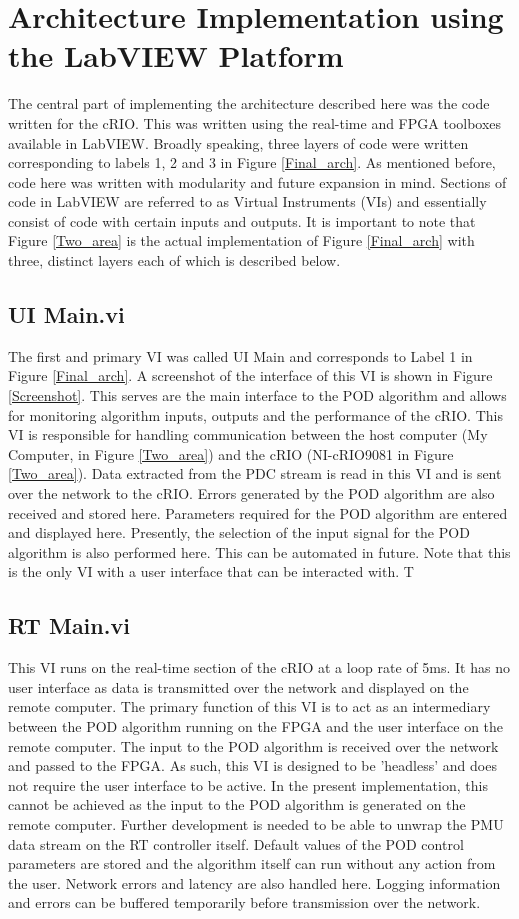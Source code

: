 \documentclass[conference]{IEEEtran}
\begin{document}
\section{Architecture Implementation using the LabVIEW Platform} \label{HILtest}
The central part of implementing the architecture described here was the code written for the cRIO. This was written using the real-time and FPGA toolboxes available in LabVIEW\cite{cRIO9081}. Broadly speaking, three layers of code were written corresponding to labels 1, 2 and 3 in Figure \ref{Final_arch}. As mentioned before, code here was written with modularity and future expansion in mind. Sections of code in LabVIEW are referred to as Virtual Instruments (VIs) and essentially consist of code with certain inputs and outputs\cite{cRIO9081}. It is important to note that Figure \ref{Two_area} is the actual implementation of Figure \ref{Final_arch} with three, distinct layers each of which is described below.
\subsection{UI Main.vi} The first and primary VI was called UI Main and corresponds to Label 1 in Figure \ref{Final_arch}. A screenshot of the interface of this VI is shown in Figure \ref{Screenshot}. This serves are the main interface to the POD algorithm and allows for monitoring algorithm inputs, outputs and the performance of the cRIO. This VI is responsible for handling communication between the host computer (My Computer, in Figure \ref{Two_area}) and the cRIO (NI-cRIO9081 in Figure \ref{Two_area}). Data extracted from the PDC stream is read in this VI and is sent over the network to the cRIO. Errors generated by the POD algorithm are also received and stored here. Parameters required for the POD algorithm are entered and displayed here. Presently, the selection of the input signal for the POD algorithm is also performed here. This can be automated in future. Note that this is the only VI with a user interface that can be interacted with. T
\subsection{RT Main.vi}
This VI runs on the real-time section of the cRIO at a loop rate of 5ms. It has no user interface as data is transmitted over the network and displayed on the remote computer. The primary function of this VI is to act as an intermediary between the POD algorithm running on the FPGA and the user interface on the remote computer. The input to the POD algorithm is received over the network and passed to the FPGA. As such, this VI is designed to be 'headless' and does not require the user interface to be active. In the present implementation, this cannot be achieved as the input to the POD algorithm is generated on the remote computer. Further development is needed to be able to unwrap the PMU data stream on the RT controller itself. Default values of the POD control parameters are stored and the algorithm itself can run without any action from the user. Network errors and latency are also handled here. Logging information and errors can be buffered temporarily before transmission over the network.
\end{document}
